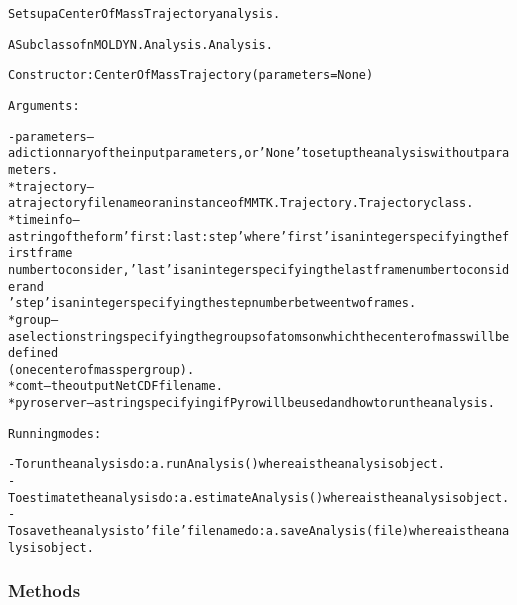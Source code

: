 \begin{alltt}
Sets up a Center Of Mass Trajectory analysis.

A Subclass of nMOLDYN.Analysis.Analysis. 

Constructor: CenterOfMassTrajectory({\textbar}parameters{\textbar} = None)

Arguments:

    - {\textbar}parameters{\textbar} -- a dictionnary of the input parameters, or 'None' to set up the analysis without parameters.
        * trajectory -- a trajectory file name or an instance of MMTK.Trajectory.Trajectory class.
        * timeinfo   -- a string of the form 'first:last:step' where 'first' is an integer specifying the first frame 
                        number to consider, 'last' is an integer specifying the last frame number to consider and 
                        'step' is an integer specifying the step number between two frames.
        * group      -- a selection string specifying the groups of atoms on which the center of mass will be defined
                        (one center of mass per group).
        * comt       -- the output NetCDF file name.
        * pyroserver -- a string specifying if Pyro will be used and how to run the analysis.
    
Running modes:

    - To run the analysis do: a.runAnalysis() where a is the analysis object.
    - To estimate the analysis do: a.estimateAnalysis() where a is the analysis object.
    - To save the analysis to 'file' file name do: a.saveAnalysis(file) where a is the analysis object.
\end{alltt}



  \subsubsection{Methods}

    \vspace{0.5ex}

